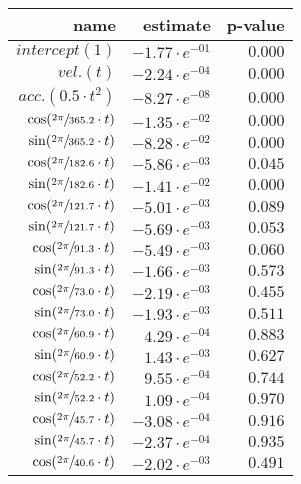 \begin{tabular}{r|rr}
\hline
 name                                & estimate              & p-value   \\
\hline
 $intercept (1)$                     & $-1.77 \cdot e^{-01}$ & $0.000$   \\
 $vel. (t)$                          & $-2.24 \cdot e^{-04}$ & $0.000$   \\
 $acc. (0.5 \cdot t^2)$              & $-8.27 \cdot e^{-08}$ & $0.000$   \\
 $\cos(\sfrac{2\pi}{365.2} \cdot t)$ & $-1.35 \cdot e^{-02}$ & $0.000$   \\
 $\sin(\sfrac{2\pi}{365.2} \cdot t)$ & $-8.28 \cdot e^{-02}$ & $0.000$   \\
 $\cos(\sfrac{2\pi}{182.6} \cdot t)$ & $-5.86 \cdot e^{-03}$ & $0.045$   \\
 $\sin(\sfrac{2\pi}{182.6} \cdot t)$ & $-1.41 \cdot e^{-02}$ & $0.000$   \\
 $\cos(\sfrac{2\pi}{121.7} \cdot t)$ & $-5.01 \cdot e^{-03}$ & $0.089$   \\
 $\sin(\sfrac{2\pi}{121.7} \cdot t)$ & $-5.69 \cdot e^{-03}$ & $0.053$   \\
 $\cos(\sfrac{2\pi}{91.3} \cdot t)$  & $-5.49 \cdot e^{-03}$ & $0.060$   \\
 $\sin(\sfrac{2\pi}{91.3} \cdot t)$  & $-1.66 \cdot e^{-03}$ & $0.573$   \\
 $\cos(\sfrac{2\pi}{73.0} \cdot t)$  & $-2.19 \cdot e^{-03}$ & $0.455$   \\
 $\sin(\sfrac{2\pi}{73.0} \cdot t)$  & $-1.93 \cdot e^{-03}$ & $0.511$   \\
 $\cos(\sfrac{2\pi}{60.9} \cdot t)$  & $4.29 \cdot e^{-04}$  & $0.883$   \\
 $\sin(\sfrac{2\pi}{60.9} \cdot t)$  & $1.43 \cdot e^{-03}$  & $0.627$   \\
 $\cos(\sfrac{2\pi}{52.2} \cdot t)$  & $9.55 \cdot e^{-04}$  & $0.744$   \\
 $\sin(\sfrac{2\pi}{52.2} \cdot t)$  & $1.09 \cdot e^{-04}$  & $0.970$   \\
 $\cos(\sfrac{2\pi}{45.7} \cdot t)$  & $-3.08 \cdot e^{-04}$ & $0.916$   \\
 $\sin(\sfrac{2\pi}{45.7} \cdot t)$  & $-2.37 \cdot e^{-04}$ & $0.935$   \\
 $\cos(\sfrac{2\pi}{40.6} \cdot t)$  & $-2.02 \cdot e^{-03}$ & $0.491$   \\
\hline
\end{tabular}\hspace{1cm}\begin{tabular}{r|rr}

\end{tabular}
